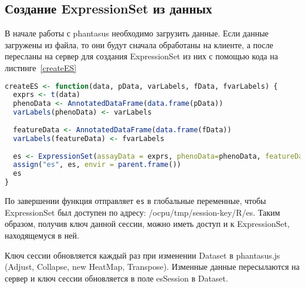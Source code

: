 \documentclass[annotation,specification]{itmo-student-thesis}
\begin{document}
\subsection{Создание ExpressionSet из данных}
В начале работы с phantasus необходимо загрузить данные. Если данные загружены из файла, то они будут сначала обработаны на клиенте, а после пересланы на сервер для создания ExpressionSet из них с помощью кода на листинге~\ref{createES}

\begin{lstlisting}[float=!h,caption={Функция создания ExpressionSet из исходных данных},label={createES},language=R]
createES <- function(data, pData, varLabels, fData, fvarLabels) {
  exprs <- t(data)
  phenoData <- AnnotatedDataFrame(data.frame(pData))
  varLabels(phenoData) <- varLabels
  
  featureData <- AnnotatedDataFrame(data.frame(fData))
  varLabels(featureData) <- fvarLabels
 
  es <- ExpressionSet(assayData = exprs, phenoData=phenoData, featureData = featureData)
  assign("es", es, envir = parent.frame())
  es
}
\end{lstlisting}

По завершении функция отправляет \texttt{es} в глобальные переменные, чтобы ExpressionSet был доступен по адресу: /ocpu/tmp/session-key/R/es. Таким образом, получив ключ данной сессии, можно иметь доступ и к ExpressionSet, находящемуся в ней.

Ключ сессии обновляется каждый раз при изменении Dataset в phantasus.js (Adjust, Collapse, new HeatMap, Transpose). Изменные данные пересылаются на сервер и ключ сессии обновляется в поле esSession в Dataset.
\end{document}
